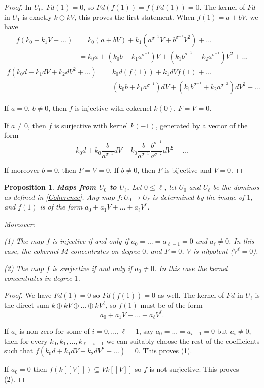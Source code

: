 \documentclass[a4paper,12pt,twoside]{report}
\newtheorem{proposition}[theorem]{Proposition}
\begin{document}
\begin{proof}
    In $U_0$, $Fd(1)=0$, so $Fd(f(1))=f(Fd(1))=0$. 
The kernel of $Fd$ in $U_1$ is exactly $k\oplus kV$, this proves the first statement. 
When $f(1)=a+bV$, we have \[\begin{aligned}
    f(k_0+k_1V+...)&=k_0(a+bV)+k_1(a^{\sigma^{-1}}V+b^{\sigma^{-1}}V^2)+... \\
                   &=k_0a+(k_0b+k_1a^{\sigma^{-1}})V+(k_1b^{\sigma^{-1}}+k_2a^{\sigma^{-1}})V^2+...
\end{aligned}\]
\[\begin{aligned}
    f(k_0d+k_1dV+k_2dV^2+...)&=k_0d(f(1))+k_1dVf(1)+...\\
                             &=(k_0b+k_1a^{\sigma^{-1}})dV+(k_1b^{\sigma^{-1}}+k_2a^{\sigma^{-2}})dV^2+...
\end{aligned}\]

If $a=0$, $b\neq 0$, then $f$ is injective with cokernel $k(0)$, $F=V=0$. 

If $a\neq 0$, then $f$ is surjective with kernel $k(-1)$, generated by a vector of the form 
\[k_0d+k_0\frac{b}{a^{\sigma^{-1}}}dV+k_0\frac{b}{a^{\sigma^{-1}}}\frac{b^{\sigma^{-1}}}{a^{\sigma^{-2}}}dV^2+...\]

If moreover $b=0$, then $F=V=0$. If $b\neq 0$, then $F$ is bijective and $V=0$. 
\end{proof} 

\begin{proposition}{\bf Maps from $U_0$ to $U_{\ell}$.}
    Let $0\leqslant \ell$, let $U_0$ and $U_{\ell}$ be the dominos as defined in \ref{Coherence}. 
    Any map $f:U_0\rightarrow U_{\ell}$ is determined by the image of $1$, 
and $f(1)$ is of the form $a_0+a_1V+...+a_{\ell}V^{\ell}$.

    Moreover: 
    
    {\rm (1)} The map $f$ is injective if and only if $a_0=...=a_{\ell-1}=0$ and $a_{\ell}\neq 0$. 
    In this case, the cokernel $M$ concentrates on degree $0$, and $F=0$, $V$ is nilpotent ($V^{\ell}=0$). 

    {\rm (2)} The map $f$ is surjective if and only if $a_0\neq 0$. 
    In this case the kernel concentrates in degree $1$. 

\end{proposition}

\begin{proof}
    We have $Fd(1)=0$ so $Fd(f(1))=0$ as well. The kernel of $Fd$ in $U_{\ell}$ is the direct sum 
$k\oplus kV\oplus...\oplus kV^{\ell}$, so $f(1)$ must be of the form \[a_0+a_1V+...+a_{\ell}V^{\ell}.\] 

If $a_i$ is non-zero for some of $i=0,...,\ell-1$, say $a_0=...=a_{i-1}=0$ but $a_i\neq 0$, 
then for every $k_0,k_1,...,k_{\ell-i-1}$ we can suitably choose the rest of the coefficients such that $f(k_0d+k_1dV+k_2dV^2+...)=0$. 
This proves (1). 

If $a_0=0$ then $f(k[[V]])\subseteq Vk[[V]]$ so $f$ is not surjective. This proves (2).
\end{proof} 
\end{document}

